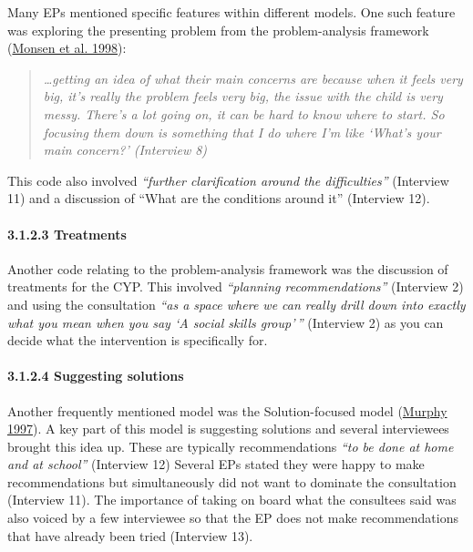 \documentclass[
]{article}
\begin{document}
Many EPs mentioned specific features within different models. One such
feature was exploring the presenting problem from the problem-analysis
framework
(\protect\hyperlink{ref-monsenAccountableModelPractice1998}{Monsen et
al. 1998}):

\begin{quote}
\emph{\ldots getting an idea of what their main concerns are because
when it feels very big, it's really the problem feels very big, the
issue with the child is very messy. There's a lot going on, it can be
hard to know where to start. So focusing them down is something that I
do where I'm like `What's your main concern?' (Interview 8)}
\end{quote}

This code also involved \emph{``further clarification around the
difficulties''} (Interview 11) and a discussion of ``What are the
conditions around it'' (Interview 12).

\hypertarget{treatments}{%
\paragraph{3.1.2.3 Treatments}\label{treatments}}

Another code relating to the problem-analysis framework was the
discussion of treatments for the CYP. This involved \emph{``planning
recommendations''} (Interview 2) and using the consultation \emph{``as a
space where we can really drill down into exactly what you mean when you
say `A social skills group'\,''} (Interview 2) as you can decide what
the intervention is specifically for.

\hypertarget{suggesting-solutions}{%
\paragraph{3.1.2.4 Suggesting solutions}\label{suggesting-solutions}}

Another frequently mentioned model was the Solution-focused model
(\protect\hyperlink{ref-murphySolutionfocusedCounselingSchools1997}{Murphy
1997}). A key part of this model is suggesting solutions and several
interviewees brought this idea up. These are typically recommendations
\emph{``to be done at home and at school''} (Interview 12) Several EPs
stated they were happy to make recommendations but simultaneously did
not want to dominate the consultation (Interview 11). The importance of
taking on board what the consultees said was also voiced by a few
interviewee so that the EP does not make recommendations that have
already been tried (Interview 13).
\end{document}

